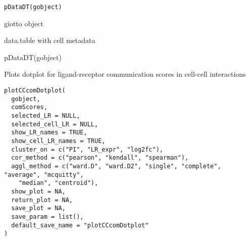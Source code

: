 \documentclass[a4paper]{book}
\begin{document}
%
\begin{Usage}
\begin{verbatim}
pDataDT(gobject)
\end{verbatim}
\end{Usage}
%
\begin{Arguments}
\begin{ldescription}
\item[\code{gobject}] giotto object
\end{ldescription}
\end{Arguments}
%
\begin{Value}
data.table with cell metadata
\end{Value}
%
\begin{Examples}
\begin{ExampleCode}
    pDataDT(gobject)
\end{ExampleCode}
\end{Examples}
%
\begin{Description}\relax
Plots dotplot for ligand-receptor communication scores in cell-cell interactions
\end{Description}
%
\begin{Usage}
\begin{verbatim}
plotCCcomDotplot(
  gobject,
  comScores,
  selected_LR = NULL,
  selected_cell_LR = NULL,
  show_LR_names = TRUE,
  show_cell_LR_names = TRUE,
  cluster_on = c("PI", "LR_expr", "log2fc"),
  cor_method = c("pearson", "kendall", "spearman"),
  aggl_method = c("ward.D", "ward.D2", "single", "complete", "average", "mcquitty",
    "median", "centroid"),
  show_plot = NA,
  return_plot = NA,
  save_plot = NA,
  save_param = list(),
  default_save_name = "plotCCcomDotplot"
)
\end{verbatim}
\end{Usage}
%
\end{document}
